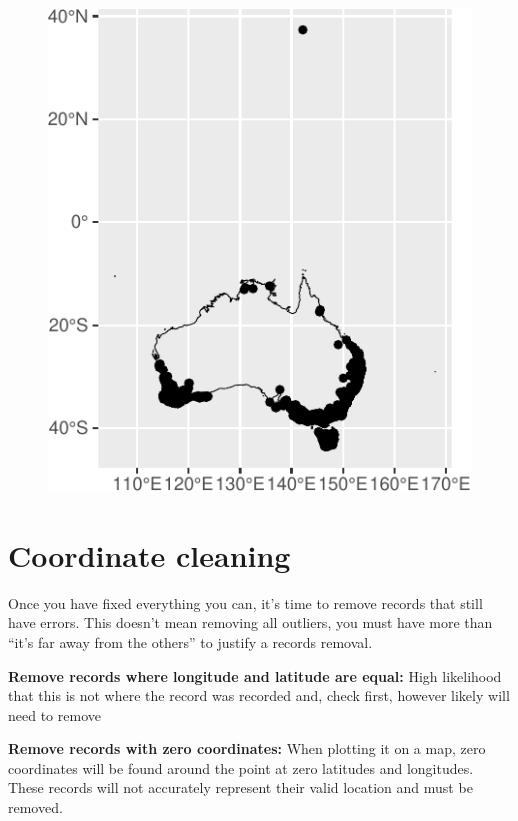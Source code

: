 \documentclass[
  letterpaper,
  DIV=11,
  numbers=noendperiod,
  oneside]{scrreprt}
\begin{document}
\begin{figure}[H]

{\centering \includegraphics{spatial_files/figure-pdf/unnamed-chunk-10-1.pdf}

}

\end{figure}

\hypertarget{coordinate-cleaning}{%
\section{Coordinate cleaning}\label{coordinate-cleaning}}

Once you have fixed everything you can, it's time to remove records that
still have errors. This doesn't mean removing all outliers, you must
have more than ``it's far away from the others'' to justify a records
removal.

\textbf{Remove records where longitude and latitude are equal:} High
likelihood that this is not where the record was recorded and, check
first, however likely will need to remove

\textbf{Remove records with zero coordinates:} When plotting it on a
map, zero coordinates will be found around the point at zero latitudes
and longitudes. These records will not accurately represent their valid
location and must be removed.
\end{document}
